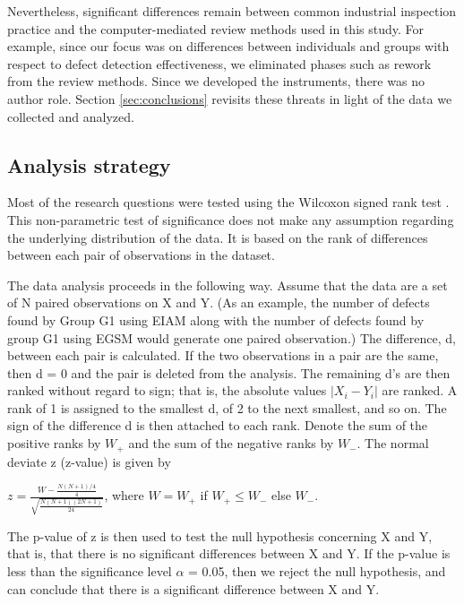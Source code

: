 Nevertheless, significant differences remain between common
industrial inspection practice and the computer-mediated review methods
used in this study. For example, since our focus was on differences between
individuals and groups with respect to defect detection effectiveness, we
eliminated phases such as rework from the review methods. Since we
developed the instruments, there was no author role. Section 
\ref{sec:conclusions} revisits these threats in light of the 
data we collected and analyzed. 

\subsection{Analysis strategy}

Most of the research questions were tested using the Wilcoxon signed rank
test \cite{Ferguson89}. This non-parametric test of significance does not
make any assumption regarding the underlying distribution of the data.  It
is based on the rank of differences between each pair of observations in
the dataset.

The data analysis proceeds in the following way. Assume that the data are a
set of N paired observations on X and Y. (As an example, the number of
defects found by Group G1 using EIAM along with the number of defects found
by group G1 using EGSM would generate one paired observation.)  The
difference, d, between each pair is calculated.  If the two observations in
a pair are the same, then d = 0 and the pair is deleted from the analysis.
The remaining d's are then ranked without regard to sign; that is, the absolute
values $|X_{i} - Y_{i}|$ are ranked. A rank of 1 is assigned to the
smallest d, of 2 to the next smallest, and so on. The sign of the
difference d is then attached to each rank. Denote the sum of the positive
ranks by $W_{+}$ and the sum of the negative ranks by $W_{-}$. The normal
deviate z (z-value) is given by

\small
 \( z = \frac{W - \frac{N(N+1)/4}{4}}{\sqrt{\frac{N(N+1)(2N+1)}{24}}} \),
where $W = W_{+}$ if $W_{+} \leq W_{-}$ else $W_{-}$.

\normalsize

The p-value of z is then used to test the null hypothesis concerning X and
Y, that is, that there is no significant differences between X and Y.  If
the p-value is less than the significance level $\alpha$ = 0.05, then we
reject the null hypothesis, and can conclude that there is a significant
difference between X and Y.

